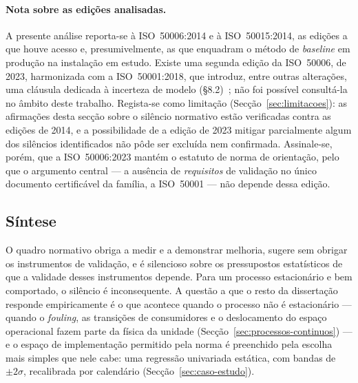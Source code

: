 \paragraph{Nota sobre as edições analisadas.} A presente análise reporta-se à ISO~50006:2014 e à ISO~50015:2014, as edições a que houve acesso e, presumivelmente, as que enquadram o método de \emph{baseline} em produção na instalação em estudo. Existe uma segunda edição da ISO~50006, de 2023, harmonizada com a ISO~50001:2018, que introduz, entre outras alterações, uma cláusula dedicada à incerteza de modelo (\S8.2)~\cite{ISO50006_2023}; não foi possível consultá-la no âmbito deste trabalho. Regista-se como limitação (Secção~\ref{sec:limitacoes}): as afirmações desta secção sobre o silêncio normativo estão verificadas contra as edições de 2014, e a possibilidade de a edição de 2023 mitigar parcialmente algum dos silêncios identificados não pôde ser excluída nem confirmada. Assinale-se, porém, que a ISO~50006:2023 mantém o estatuto de norma de orientação, pelo que o argumento central --- a ausência de \emph{requisitos} de validação no único documento certificável da família, a ISO~50001 --- não depende dessa edição.

\subsection{Síntese}
\label{sec:assimetria-sintese}

O quadro normativo obriga a medir e a demonstrar melhoria, sugere sem obrigar os instrumentos de validação, e é silencioso sobre os pressupostos estatísticos de que a validade desses instrumentos depende. Para um processo estacionário e bem comportado, o silêncio é inconsequente. A questão a que o resto da dissertação responde empiricamente é o que acontece quando o processo não é estacionário --- quando o \emph{fouling}, as transições de consumidores e o deslocamento do espaço operacional fazem parte da física da unidade (Secção~\ref{sec:processos-continuos}) --- e o espaço de implementação permitido pela norma é preenchido pela escolha mais simples que nele cabe: uma regressão univariada estática, com bandas de $\pm 2\sigma$, recalibrada por calendário (Secção~\ref{sec:caso-estudo}).

